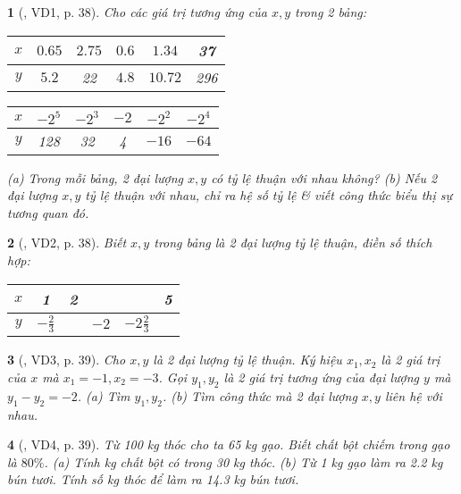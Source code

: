 \documentclass{article}
\newtheorem{baitoan}{}
\begin{document}
\begin{baitoan}[\cite{Binh_boi_duong_Toan_7_tap_1}, VD1, p. 38]
	Cho các giá trị tương ứng của $x,y$ trong 2 bảng:
	\begin{table}[H]
		\centering
		\begin{tabular}{|c|c|c|c|c|c|}
			\hline
			$x$ & $0.65$ & $2.75$ & $0.6$ & $1.34$ & 37 \\
			\hline
			$y$ & $5.2$ & 22 & $4.8$ & $10.72$ & 296 \\
			\hline
		\end{tabular}\hspace{1cm}
		\begin{tabular}{|c|c|c|c|c|c|}
			\hline
			$x$ & $-2^5$ & $-2^3$ & $-2$ & $-2^2$ & $-2^4$ \\
			\hline
			$y$ & 128 & 32 & 4 & $-16$ & $-64$ \\
			\hline
		\end{tabular}
	\end{table}
	\noindent(a) Trong mỗi bảng, 2 đại lượng $x,y$ có tỷ lệ thuận với nhau không? (b) Nếu 2 đại lượng $x,y$ tỷ lệ thuận với nhau, chỉ ra hệ số tỷ lệ \& viết công thức biểu thị sự tương quan đó.
\end{baitoan}

\begin{baitoan}[\cite{Binh_boi_duong_Toan_7_tap_1}, VD2, p. 38]
	Biết $x,y$ trong bảng là 2 đại lượng tỷ lệ thuận, điền số thích hợp:
	\begin{table}[H]
		\centering
		\begin{tabular}{|c|c|c|c|c|c|}
			\hline
			$x$ & 1 & 2 & & & 5 \\
			\hline
			$y$ & $-\frac{2}{3}$ & & $-2$ & $-2\frac{2}{3}$ & \\
			\hline
		\end{tabular}
	\end{table}
\end{baitoan}

\begin{baitoan}[\cite{Binh_boi_duong_Toan_7_tap_1}, VD3, p. 39]
	Cho $x,y$ là 2 đại lượng tỷ lệ thuận. Ký hiệu $x_1,x_2$ là 2 giá trị của $x$ mà $x_1 = -1,x_2 = -3$. Gọi $y_1,y_2$ là 2 giá trị tương ứng của đại lượng $y$ mà $y_1 - y_2 = -2$. (a) Tìm $y_1,y_2$. (b) Tìm công thức mà 2 đại lượng $x,y$ liên hệ với nhau.
\end{baitoan}

\begin{baitoan}[\cite{Binh_boi_duong_Toan_7_tap_1}, VD4, p. 39]
	Từ {\rm100 kg} thóc cho ta {\rm65 kg} gạo. Biết chất bột chiếm trong gạo là $80\%$. (a) Tính {\rm kg} chất bột có trong {\rm30 kg} thóc. (b) Từ {\rm1 kg} gạo làm ra {\rm2.2 kg} bún tươi. Tính số {\rm kg} thóc để làm ra {\rm14.3 kg} bún tươi.
\end{baitoan}
\end{document}
